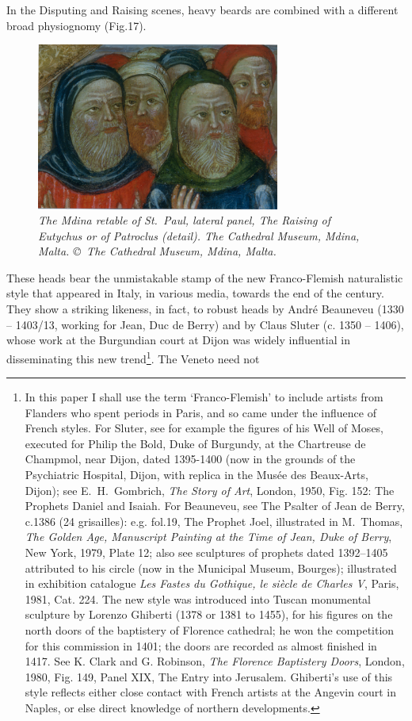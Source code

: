 \documentclass[a4paper,12pt]{article}
\begin{document}
In the Disputing and Raising scenes, heavy beards are combined with a
different broad physiognomy (Fig.17). 
\begin{figure}[htbp]
\centering
\includegraphics[width=8cm]{pics/fig17.png}
\caption[The Mdina retable of St.~Paul, lateral panel, The Raising
  of Eutychus or of Patroclus (detail)]
{\it The Mdina retable of St.~Paul, lateral panel, The Raising
  of Eutychus or of Patroclus (detail).  
The Cathedral Museum, Mdina, Malta. \copyright\ The Cathedral Museum,
  Mdina, Malta.} 
\end{figure}
These heads bear the
unmistakable stamp of the new Franco-Flemish naturalistic style that
appeared in Italy, in various media, towards the end of the century.
They show a striking likeness, in fact, to robust heads by Andr\'e
Beauneveu (1330 -- 1403/13, working for Jean, Duc de Berry) and by
Claus Sluter (c. 1350 -- 1406), whose work at the Burgundian court at
Dijon was widely influential in disseminating this new
trend\footnote{In this paper I shall use the term `Franco-Flemish' to
include artists from Flanders who spent periods in Paris, and so came
under the influence of French styles. For Sluter, see for example the
figures of his Well of Moses, executed for Philip the Bold, Duke of
Burgundy, at the Chartreuse de Champmol, near Dijon, dated 1395-1400
(now in the grounds of the Psychiatric Hospital, Dijon, with replica
in the Mus\'ee des Beaux-Arts, Dijon); see E.~H.~Gombrich, \textit{The
Story of Art}, London, 1950, Fig. 152: The Prophets Daniel and
Isaiah. For Beauneveu, see The Psalter of Jean de Berry, c.1386 (24
grisailles): e.g. fol.19, The Prophet Joel, illustrated in M.~Thomas,
\textit{The Golden Age, Manuscript Painting at the Time of Jean, Duke
of Berry}, New York, 1979, Plate 12; also see sculptures of prophets
dated 1392--1405 attributed to his circle (now in the Municipal
Museum, Bourges); illustrated in exhibition catalogue \textit{Les
Fastes du Gothique, le si\`ecle de Charles V}, Paris, 1981,
Cat. 224. The new style was introduced into Tuscan monumental
sculpture by Lorenzo Ghiberti (1378 or 1381 to 1455), for his figures
on the north doors of the baptistery of Florence cathedral; he won the
competition for this commission in 1401; the doors are recorded as
almost finished in 1417.  See K. Clark and G. Robinson, \textit{The
Florence Baptistery Doors}, London, 1980, Fig. 149, Panel XIX, The
Entry into Jerusalem. Ghiberti's use of this style reflects either
close contact with French artists at the Angevin court in Naples, or
else direct knowledge of northern developments.}. The Veneto need not
\end{document}
